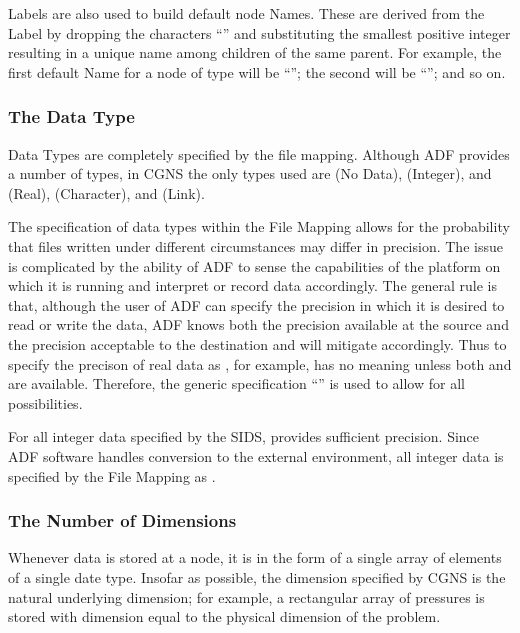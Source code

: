 Labels are also used to build default node Names. These are derived from
the Label by dropping the characters ``'' and substituting the
smallest positive integer resulting in a unique name among children
of the same parent. For example, the first default Name for a node
of type  will be ``''; the second will be
``''; and so on.

\subsubsection{The Data Type}

Data Types are completely specified by the file mapping. Although ADF
provides a number of types, in CGNS the only types used are 
(No Data),  (Integer),  and  (Real),
 (Character), and  (Link).

The specification of data types within the File Mapping allows for the
probability that files written under different circumstances may differ
in precision. The issue is complicated by the ability of ADF to sense
the capabilities of the platform on which it is running and interpret or
record data accordingly. The general rule is that, although the user of
ADF can specify the precision in which it is desired to read or write
the data, ADF knows both the precision available at the source and the
precision acceptable to the destination and will mitigate accordingly.
Thus to specify the precison of real data as , for example, has
no meaning unless both  and  are available. Therefore,
the generic specification ``'' is used to allow for all
possibilities.

For all integer data specified by the SIDS,  provides
sufficient precision. Since ADF software handles conversion to the
external environment, all integer data is specified by the File Mapping
as .

\subsubsection{The Number of Dimensions}

Whenever data is stored at a node, it is in the form of a single array
of elements of a single date type. Insofar as possible, the dimension
specified by CGNS is the natural underlying dimension; for example, a
rectangular array of pressures is stored with dimension equal to the
physical dimension of the problem.

